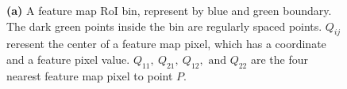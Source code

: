 \begin{figure}[!ht]
    \centering
    \caption{\textbf{(a)} A feature map RoI bin, represent by blue and green boundary. The dark green points inside the bin are regularly spaced points. $Q_{ij}$ reresent the center of a feature map pixel, which has a coordinate and a feature pixel value. $Q_{11},\ Q_{21},\ Q_{12},\text{ and } Q_{22}$ are the four nearest feature map pixel to point $P$.}
    \label{fig:bin_w_regularly_points}
\end{figure}

